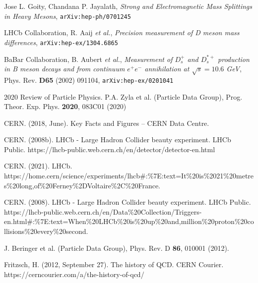 \documentclass[12pt, letterpaper]{article}
\begin{document}
\begin{thebibliography}{9}

Jose L. Goity, Chandana P. Jayalath,
\textit{Strong and Electromagnetic Mass Splittings in Heavy Mesons},
\texttt{arXiv:hep-ph/0701245}

LHCb Collaboration, R. Aaij \textit{et al.},
\textit{Precision measurement of D meson mass differences},
\texttt{arXiv:hep-ex/1304.6865}

BaBar Collaboration, B. Aubert \textit{et al.},
\textit{Measurement of $D^+_s$ and $D^{*+}_s$ production in B meson decays and from continuum $e^+e^-$ annihilation at $\sqrt{s} = 10.6$ GeV},
Phys. Rev. \textbf{D65} (2002) 091104, \texttt{arXiv:hep-ex/0201041}

2020 Review of Particle Physics.
P.A. Zyla et al. (Particle Data Group), Prog. Theor. Exp. Phys. \textbf{2020}, 083C01 (2020)

CERN. (2018, June). Key Facts and Figures – CERN Data Centre.

CERN. (2008b). LHCb - Large Hadron Collider beauty experiment. LHCb Public. https://lhcb-public.web.cern.ch/en/detector/detector-en.html

CERN. (2021). LHCb. https://home.cern/science/experiments/lhcb\#:\%7E:text=It\%20is\%2021\%20metres\%20long,of\%20Ferney\%2DVoltaire\%2C\%20France.

CERN. (2008). LHCb - Large Hadron Collider beauty experiment. LHCb Public. https://lhcb-public.web.cern.ch/en/Data\%20Collection/Triggers-en.html\#:\%7E:text=When\%20LHCb\%20is\%20up\%20and,million\%20proton\%20collisions\%20every\%20second.

J. Beringer et al. (Particle Data Group), Phys. Rev. D \textbf{86}, 010001 (2012).

Fritzsch, H. (2012, September 27). The history of QCD. CERN Courier. https://cerncourier.com/a/the-history-of-qcd/





\end{thebibliography}
\end{document}
